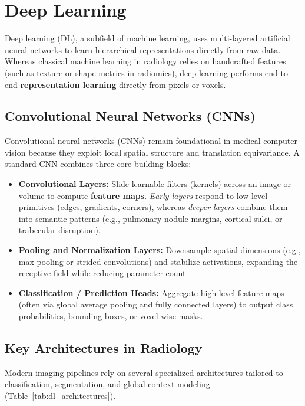 \chapter{Deep Learning}
\label{ch:deep_learning}

Deep learning (DL), a subfield of machine learning, uses multi-layered artificial neural networks to learn hierarchical representations directly from raw data. Whereas classical machine learning in radiology relies on handcrafted features (such as texture or shape metrics in radiomics), deep learning performs end-to-end \textbf{representation learning} directly from pixels or voxels.

\section{Convolutional Neural Networks (CNNs)}
Convolutional neural networks (CNNs) remain foundational in medical computer vision because they exploit local spatial structure and translation equivariance. A standard CNN combines three core building blocks:
\begin{itemize}
    \item \textbf{Convolutional Layers:} Slide learnable filters (kernels) across an image or volume to compute \textbf{feature maps}. \textit{Early layers} respond to low-level primitives (edges, gradients, corners), whereas \textit{deeper layers} combine them into semantic patterns (e.g., pulmonary nodule margins, cortical sulci, or trabecular disruption).
    \item \textbf{Pooling and Normalization Layers:} Downsample spatial dimensions (e.g., max pooling or strided convolutions) and stabilize activations, expanding the receptive field while reducing parameter count.
    \item \textbf{Classification / Prediction Heads:} Aggregate high-level feature maps (often via global average pooling and fully connected layers) to output class probabilities, bounding boxes, or voxel-wise masks.
\end{itemize}

\section{Key Architectures in Radiology}
Modern imaging pipelines rely on several specialized architectures tailored to classification, segmentation, and global context modeling (Table~\ref{tab:dl_architectures}).

